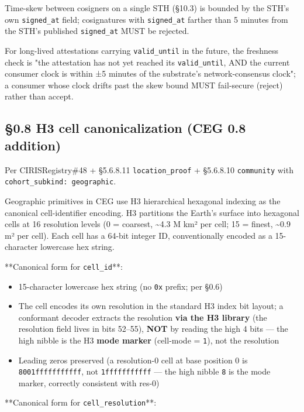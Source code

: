 \documentclass[11pt]{article}
\begin{document}
Time-skew between cosigners on a single STH (§10.3) is bounded by the STH's own \texttt{signed\_at} field; cosignatures with \texttt{signed\_at} farther than 5 minutes from the STH's published \texttt{signed\_at} MUST be rejected.


For long-lived attestations carrying \texttt{valid\_until} in the future, the freshness check is "the attestation has not yet reached its \texttt{valid\_until}, AND the current consumer clock is within ±5 minutes of the substrate's network-consensus clock"; a consumer whose clock drifts past the skew bound MUST fail-secure (reject) rather than accept.



\subsection*{§0.8 H3 cell canonicalization (CEG 0.8 addition)}


Per CIRISRegistry\#48 + §5.6.8.11 \texttt{location\_proof} + §5.6.8.10 \texttt{community} with \texttt{cohort\_subkind: geographic}.


Geographic primitives in CEG use H3 hierarchical hexagonal indexing as the canonical cell-identifier encoding. H3 partitions the Earth's surface into hexagonal cells at 16 resolution levels (0 = coarsest, \textasciitilde{}4.3 M km² per cell; 15 = finest, \textasciitilde{}0.9 m² per cell). Each cell has a 64-bit integer ID, conventionally encoded as a 15-character lowercase hex string.


**Canonical form for \texttt{cell\_id}**:


\begin{itemize}\setlength\itemsep{0pt}
\item 15-character lowercase hex string (no \texttt{0x} prefix; per §0.6)
\item The cell encodes its own resolution in the standard H3 index bit layout; a conformant decoder extracts the resolution \textbf{via the H3 library} (the resolution field lives in bits 52–55), \textbf{NOT} by reading the high 4 bits — the high nibble is the H3 \textbf{mode marker} (cell-mode = \texttt{1}), not the resolution
\item Leading zeros preserved (a resolution-0 cell at base position 0 is \texttt{8001fffffffffff}, not \texttt{1fffffffffff} — the high nibble \texttt{8} is the mode marker, correctly consistent with res-0)
\end{itemize}


**Canonical form for \texttt{cell\_resolution}**:
\end{document}
